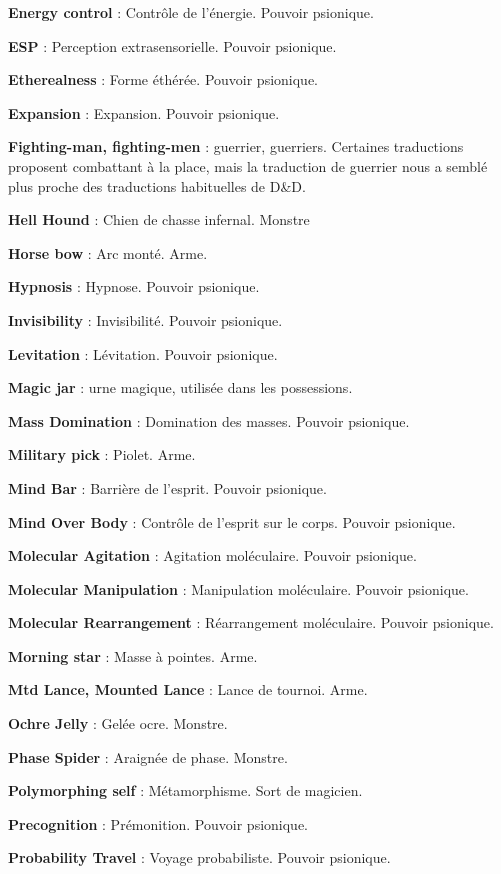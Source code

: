 \documentclass[11pt]{article}
\begin{document}
{{\textbf{Energy control} : Contrôle de l'énergie. Pouvoir psionique.

\textbf{ESP} : Perception extrasensorielle. Pouvoir psionique.

\textbf{Etherealness} : Forme éthérée. Pouvoir psionique.

\textbf{Expansion} : Expansion. Pouvoir psionique.

\textbf{Fighting-man, fighting-men} : guerrier, guerriers. Certaines traductions proposent \og combattant \fg{} à la place, mais la traduction de guerrier nous a semblé plus proche des traductions habituelles de D\&D.

\textbf{Hell Hound} : Chien de chasse infernal. Monstre

\textbf{Horse bow} : Arc monté. Arme.

\textbf{Hypnosis} : Hypnose. Pouvoir psionique.

\textbf{Invisibility} : Invisibilité. Pouvoir psionique.

\textbf{Levitation} : Lévitation. Pouvoir psionique.

\textbf{Magic jar} : urne magique, utilisée dans les possessions.

\textbf{Mass Domination} : Domination des masses. Pouvoir psionique.

\textbf{Military pick} : Piolet. Arme.

\textbf{Mind Bar} : Barrière de l'esprit. Pouvoir psionique.

\textbf{Mind Over Body} : Contrôle de l'esprit sur le corps. Pouvoir psionique.

\textbf{Molecular Agitation} : Agitation moléculaire. Pouvoir psionique.

\textbf{Molecular Manipulation} : Manipulation moléculaire. Pouvoir psionique.

\textbf{Molecular Rearrangement} : Réarrangement moléculaire. Pouvoir psionique.

\textbf{Morning star} : Masse à pointes. Arme.

\textbf{Mtd Lance, Mounted Lance} : Lance de tournoi. Arme.

\textbf{Ochre Jelly} : Gelée ocre. Monstre.

\textbf{Phase Spider} : Araignée de phase. Monstre.

\textbf{Polymorphing self} : Métamorphisme. Sort de magicien.

\textbf{Precognition} : Prémonition. Pouvoir psionique.

\textbf{Probability Travel} : Voyage probabiliste. Pouvoir psionique.

}}
\end{document}
